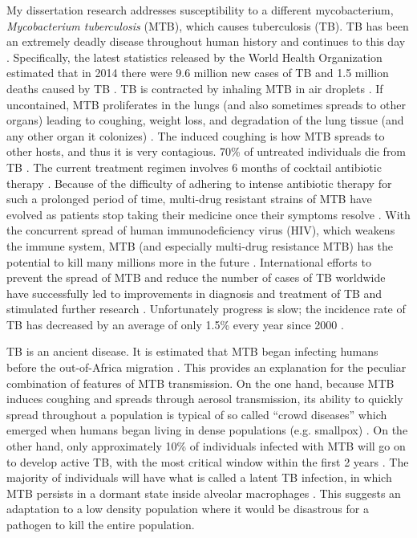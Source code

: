 My dissertation research addresses susceptibility to a different
mycobacterium, \emph{Mycobacterium tuberculosis} (MTB), which causes
tuberculosis (TB). TB has been an extremely deadly disease throughout
human history and continues to this day \citep{Glaziou2015}. Specifically, the latest
statistics released by the World Health Organization estimated that in
2014 there were 9.6 million new cases of TB and 1.5 million deaths
caused by TB \citep{WHO2015a, WHO2015b}. TB is contracted by inhaling
MTB in air droplets \citep{Nardell2016}. If uncontained, MTB proliferates in the lungs
(and also sometimes spreads to other organs) leading to coughing,
weight loss, and degradation of the lung tissue (and any other organ
it colonizes) \citep{Loddenkemper2016}. The induced coughing is how MTB spreads to other hosts,
and thus it is very contagious. 70\% of untreated individuals die from
TB \citep{WHO2015a}. The current treatment regimen involves 6 months of cocktail
antibiotic therapy \citep{Sotgiu2015}. Because of the difficulty of adhering to intense
antibiotic therapy for such a prolonged period of time, multi-drug
resistant strains of MTB have evolved as patients stop taking their
medicine once their symptoms resolve \citep{Seung2015}. With the concurrent spread of
human immunodeficiency virus (HIV), which weakens the immune system,
MTB (and especially multi-drug resistance MTB) has the potential to
kill many millions more in the future \citep{Bruchfeld2015}. International efforts to
prevent the spread of MTB and reduce the number of cases of TB
worldwide have successfully led to improvements in diagnosis and
treatment of TB and stimulated further research \citep{Glaziou2015, WHO2015a}. Unfortunately
progress is slow; the incidence rate of TB has decreased by an average
of only 1.5\% every year since 2000 \citep{WHO2015a}.

TB is an ancient disease. It is estimated that MTB began infecting
humans before the out-of-Africa migration \cite{Comas2013}. This
provides an explanation for the peculiar combination of features of
MTB transmission. On the one hand, because MTB induces coughing and
spreads through aerosol transmission, its ability to quickly spread
throughout a population is typical of so called “crowd diseases” which
emerged when humans began living in dense populations
(e.g. smallpox) \citep{Wolfe2007}. On the other hand, only approximately 10\% of
individuals infected with MTB will go on to develop active TB, with
the most critical window within the first 2 years \citep{North2004, OGarra2013}. The majority of
individuals will have what is called a latent TB infection, in which
MTB persists in a dormant state inside alveolar macrophages \citep{Barry2009, Munoz2015}. This
suggests an adaptation to a low density population where it would be
disastrous for a pathogen to kill the entire population.

